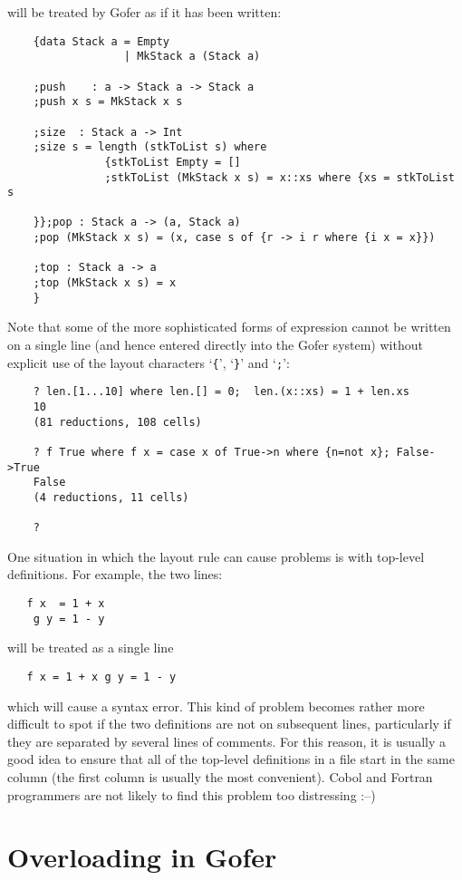 will be treated by Gofer as if it has been written:
\begin{verbatim}
    {data Stack a = Empty
                  | MkStack a (Stack a)

    ;push    : a -> Stack a -> Stack a
    ;push x s = MkStack x s

    ;size  : Stack a -> Int
    ;size s = length (stkToList s) where
               {stkToList Empty = []
               ;stkToList (MkStack x s) = x::xs where {xs = stkToList s

    }};pop : Stack a -> (a, Stack a)
    ;pop (MkStack x s) = (x, case s of {r -> i r where {i x = x}})

    ;top : Stack a -> a
    ;top (MkStack x s) = x
    }
\end{verbatim}
Note that some of the more sophisticated forms of expression cannot  be
written on a single line (and hence entered  directly  into  the  Gofer
system) without explicit use of the layout characters 
`\verb"{"', `\verb"}"' and `\verb";"':
\begin{verbatim}
    ? len.[1...10] where len.[] = 0;  len.(x::xs) = 1 + len.xs
    10
    (81 reductions, 108 cells)

    ? f True where f x = case x of True->n where {n=not x}; False->True
    False
    (4 reductions, 11 cells)

    ?
\end{verbatim}
One situation in which the layout  rule  can  cause  problems  is  with
top-level definitions.  For example, the two lines:
\begin{verbatim}
   f x  = 1 + x
    g y = 1 - y
\end{verbatim}
will be treated as a single line 
\begin{verbatim}
   f x = 1 + x g y = 1 - y
\end{verbatim}
which  will
cause a syntax  error.   This  kind  of  problem  becomes  rather  more
difficult to spot if the two definitions are not on  subsequent  lines,
particularly if they are separated by several lines of  comments.   For
this reason, it is usually a good  idea  to  ensure  that  all  of  the
top-level definitions in a file start in the  same  column  (the  first
column is usually the most convenient).  {\sc Cobol} and Fortran  programmers
are not likely to find this problem too distressing :--)

\chapter{Overloading in Gofer}

